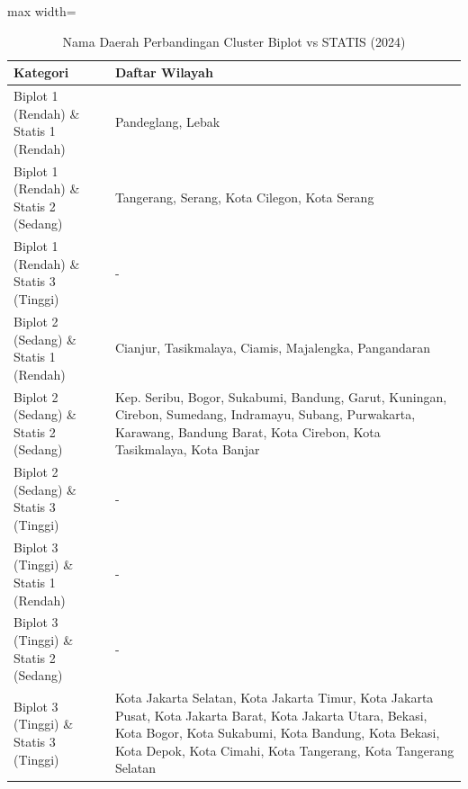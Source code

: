 \begin{table}[H]
\centering
\caption{Nama Daerah Perbandingan Cluster Biplot vs STATIS (2024)} \label{tab:appbiplot_statis_comp_name_2024}
\begin{adjustbox}{max width=\textwidth}
\begin{tabular}{|p{4cm}|p{10cm}|}
\hline
\textbf{Kategori} & \textbf{Daftar Wilayah} \\
\hline
Biplot 1 (Rendah) \& Statis 1 (Rendah) & Pandeglang, Lebak \\
\hline
Biplot 1 (Rendah) \& Statis 2 (Sedang) & Tangerang, Serang, Kota Cilegon, Kota Serang \\
\hline
Biplot 1 (Rendah) \& Statis 3 (Tinggi) & - \\
\hline
Biplot 2 (Sedang) \& Statis 1 (Rendah) & Cianjur, Tasikmalaya, Ciamis, Majalengka, Pangandaran \\
\hline
Biplot 2 (Sedang) \& Statis 2 (Sedang) & Kep. Seribu, Bogor, Sukabumi, Bandung, Garut, Kuningan, Cirebon, Sumedang, Indramayu, Subang, Purwakarta, Karawang, Bandung Barat, Kota Cirebon, Kota Tasikmalaya, Kota Banjar \\
\hline
Biplot 2 (Sedang) \& Statis 3 (Tinggi) & - \\
\hline
Biplot 3 (Tinggi) \& Statis 1 (Rendah) & - \\
\hline
Biplot 3 (Tinggi) \& Statis 2 (Sedang) & - \\
\hline
Biplot 3 (Tinggi) \& Statis 3 (Tinggi) & Kota Jakarta Selatan, Kota Jakarta Timur, Kota Jakarta Pusat, Kota Jakarta Barat, Kota Jakarta Utara, Bekasi, Kota Bogor, Kota Sukabumi, Kota Bandung, Kota Bekasi, Kota Depok, Kota Cimahi, Kota Tangerang, Kota Tangerang Selatan \\
\hline
\end{tabular}
\end{adjustbox}
\end{table}